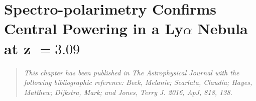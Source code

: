 
\chapter{Spectro-polarimetry Confirms Central Powering in a Ly$\alpha$ Nebula at z $= 3.09$} 
\label{app:LAB1}

\begin{quote}
\emph{This chapter has been published in The Astrophysical Journal with the following bibliographic reference:  Beck, Melanie; Scarlata, Claudia; Hayes, Matthew; Dijkstra, Mark; and Jones, Terry J. 2016, ApJ, 818, 138.}\\
\end{quote}
